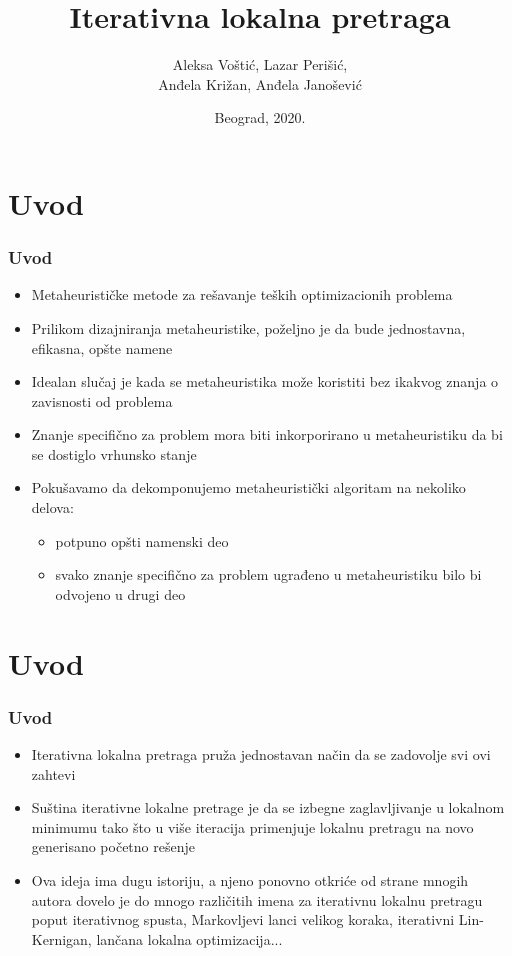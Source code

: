 \documentclass{beamer}
\begin{document}
\title{Iterativna lokalna pretraga}
\author[]{Aleksa Voštić, Lazar Perišić,\\ Anđela Križan, Anđela Janošević}
\date{
	\footnotesize{Beograd, 2020.}	
}

\begin{frame}
	\thispagestyle{empty}
	\titlepage
\end{frame}


\section*{Uvod}
\begin{frame}[fragile]
	\frametitle{Uvod}
	\begin{itemize}
		\item Metaheurističke metode za rešavanje teških optimizacionih problema
		\item Prilikom dizajniranja metaheuristike, poželjno je da bude jednostavna, efikasna, opšte namene
		\item Idealan slučaj je kada se metaheuristika može koristiti bez ikakvog znanja o zavisnosti od problema
		\item Znanje specifično za problem mora biti inkorporirano u metaheuristiku da bi se dostiglo vrhunsko stanje
		\item Pokušavamo da dekomponujemo metaheuristički algoritam na nekoliko delova:
		\begin{itemize}
			\item potpuno opšti namenski deo
			\item svako znanje specifično za problem ugrađeno u metaheuristiku bilo bi odvojeno u drugi deo
		\end{itemize}
	\end{itemize}

\end{frame}

\section*{Uvod}
\begin{frame}[fragile]
	\frametitle{Uvod}
	\begin{itemize}
		\item Iterativna lokalna pretraga pruža jednostavan način da se zadovolje svi ovi zahtevi
		\item Suština iterativne lokalne pretrage je da se izbegne zaglavljivanje u lokalnom minimumu tako što u više iteracija primenjuje lokalnu pretragu na novo generisano početno rešenje
		\item Ova ideja ima dugu istoriju, a njeno ponovno otkriće od strane mnogih autora dovelo je do mnogo različitih imena za iterativnu lokalnu pretragu poput iterativnog spusta, Markovljevi lanci velikog koraka, iterativni Lin-Kernigan, lančana lokalna optimizacija...
	\end{itemize}

\end{frame}
\end{document}
